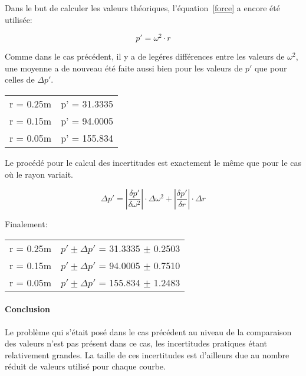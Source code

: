 Dans le but de calculer les valeurs théoriques, l'équation~\eqref{force} a encore été utilisée:

\begin{equation}
    p' = \omega^2 \cdot r
\end{equation}

Comme dans le cas précédent, il y a de legéres différences entre les valeurs de $\omega^2$, une moyenne a de nouveau été faite aussi bien pour les valeurs de $p'$ que pour celles de $\Delta p'$.

\begin{table}[ht]
    \centering
    \begin{tabular}{l l}
	r = 0.25m & p' = 31.3335 \\
	r = 0.15m & p' = 94.0005 \\
	r = 0.05m & p' = 155.834 \\
    \end{tabular}
\end{table}

Le procédé pour le calcul des incertitudes est exactement le même que pour le cas où le rayon variait.

\begin{equation}
    \Delta p' = |\frac{\delta p'}{\delta \omega^2}|\cdot \Delta \omega^2 + |\frac{\delta p'}{\delta r}|\cdot \Delta r
\end{equation}

Finalement:

\begin{table}[ht]
    \centering
    \begin{tabular}{l l}
	r = 0.25m & $p' \pm \Delta p'$ = 31.3335 $\pm$ 0.2503 \\
	r = 0.15m & $p' \pm \Delta p'$ = 94.0005 $\pm$ 0.7510 \\
	r = 0.05m & $p' \pm \Delta p'$ = 155.834 $\pm$ 1.2483 \\
    \end{tabular}
\end{table}

\paragraph{Conclusion}

Le problème qui s'était posé dans le cas précédent au niveau de la comparaison des valeurs n'est pas présent dans ce cas, les incertitudes pratiques étant relativement grandes. La taille de ces incertitudes est d'ailleurs due au nombre réduit de valeurs utilisé pour chaque courbe.

